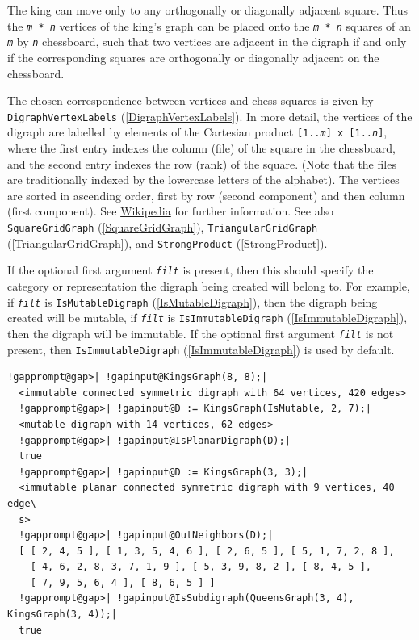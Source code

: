 \documentclass[a4paper,11pt]{report}
\begin{document}
{{{ The king can move only to any orthogonally or diagonally adjacent square. Thus
the \texttt{\mbox{\texttt{\mdseries\slshape m}} * \mbox{\texttt{\mdseries\slshape n}}} vertices of the king's graph can be placed onto the \texttt{\mbox{\texttt{\mdseries\slshape m}} * \mbox{\texttt{\mdseries\slshape n}}} squares of an \mbox{\texttt{\mdseries\slshape m}} by \mbox{\texttt{\mdseries\slshape n}} chessboard, such that two vertices are adjacent in the digraph if and only if
the corresponding squares are orthogonally or diagonally adjacent on the
chessboard. 

 The chosen correspondence between vertices and chess squares is given by \texttt{DigraphVertexLabels} (\ref{DigraphVertexLabels}). In more detail, the vertices of the digraph are labelled by elements of the
Cartesian product \texttt{[1..\mbox{\texttt{\mdseries\slshape m}}] x [1..\mbox{\texttt{\mdseries\slshape n}}]}, where the first entry indexes the column (file) of the square in the
chessboard, and the second entry indexes the row (rank) of the square. (Note
that the files are traditionally indexed by the lowercase letters of the
alphabet). The vertices are sorted in ascending order, first by row (second
component) and then column (first component). See \href{https://en.wikipedia.org/wiki/King's_graph} {Wikipedia} for further information. See also \texttt{SquareGridGraph} (\ref{SquareGridGraph}), \texttt{TriangularGridGraph} (\ref{TriangularGridGraph}), and \texttt{StrongProduct} (\ref{StrongProduct}). 

 If the optional first argument \mbox{\texttt{\mdseries\slshape filt}} is present, then this should specify the category or representation the
digraph being created will belong to. For example, if \mbox{\texttt{\mdseries\slshape filt}} is \texttt{IsMutableDigraph} (\ref{IsMutableDigraph}), then the digraph being created will be mutable, if \mbox{\texttt{\mdseries\slshape filt}} is \texttt{IsImmutableDigraph} (\ref{IsImmutableDigraph}), then the digraph will be immutable. If the optional first argument \mbox{\texttt{\mdseries\slshape filt}} is not present, then \texttt{IsImmutableDigraph} (\ref{IsImmutableDigraph}) is used by default.

 
\begin{Verbatim}[commandchars=!@|,fontsize=\small,frame=single,label=Example]
  !gapprompt@gap>| !gapinput@KingsGraph(8, 8);|
  <immutable connected symmetric digraph with 64 vertices, 420 edges>
  !gapprompt@gap>| !gapinput@D := KingsGraph(IsMutable, 2, 7);|
  <mutable digraph with 14 vertices, 62 edges>
  !gapprompt@gap>| !gapinput@IsPlanarDigraph(D);|
  true
  !gapprompt@gap>| !gapinput@D := KingsGraph(3, 3);|
  <immutable planar connected symmetric digraph with 9 vertices, 40 edge\
  s>
  !gapprompt@gap>| !gapinput@OutNeighbors(D);|
  [ [ 2, 4, 5 ], [ 1, 3, 5, 4, 6 ], [ 2, 6, 5 ], [ 5, 1, 7, 2, 8 ], 
    [ 4, 6, 2, 8, 3, 7, 1, 9 ], [ 5, 3, 9, 8, 2 ], [ 8, 4, 5 ], 
    [ 7, 9, 5, 6, 4 ], [ 8, 6, 5 ] ]
  !gapprompt@gap>| !gapinput@IsSubdigraph(QueensGraph(3, 4), KingsGraph(3, 4));|
  true
\end{Verbatim}
 }

}}
\end{document}
